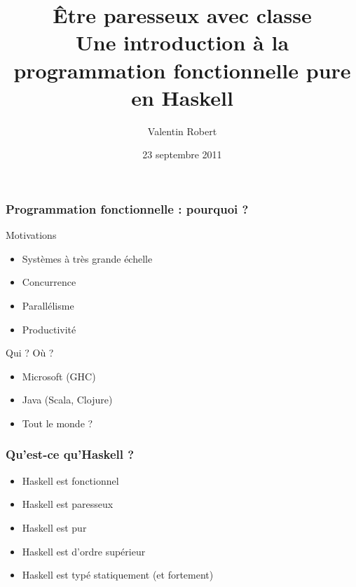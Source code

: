\documentclass[10pt]{beamer}
\title[Haskell]{Être paresseux avec classe\\
Une introduction à la programmation fonctionnelle pure en Haskell}
\author{Valentin Robert}
\institute{ENSEIRB / UCSD / INRIA}
\date{23 septembre 2011}
\begin{document}
\begin{frame}
\titlepage
\end{frame}



\begin{frame}[fragile]
\frametitle{Programmation fonctionnelle : pourquoi ?}

\begin{block}{Motivations}
\begin{itemize}
\item Systèmes à très grande échelle
\item Concurrence
\item Parallélisme
\item Productivité
\end{itemize}
\end{block}

\pause

\begin{block}{Qui ? Où ?}
\begin{itemize}
\item Microsoft (GHC)
\item Java (Scala, Clojure)
\item Tout le monde ?
\end{itemize}
\end{block}

\end{frame}



\begin{frame}
\frametitle{Qu'est-ce qu'Haskell ?}

\begin{itemize}

\item Haskell est fonctionnel
\pause

\item Haskell est paresseux
\pause

\item Haskell est pur
\pause

\item Haskell est d'ordre supérieur
\pause

\item Haskell est typé statiquement (et fortement)

\end{itemize}
\end{frame}
\end{document}
